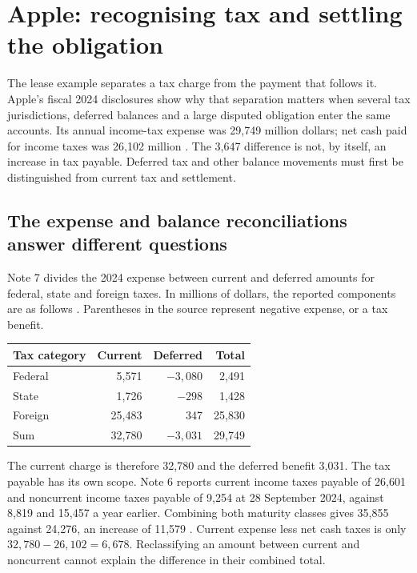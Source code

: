 \section{Apple: recognising tax and settling the obligation}
\label{sec:apple-tax-settlement}

The lease example separates a tax charge from the payment that follows it.
Apple's fiscal 2024 disclosures show why that separation matters when several
tax jurisdictions, deferred balances and a large disputed obligation enter
the same accounts. Its annual income-tax expense was 29,749 million dollars;
net cash paid for income taxes was 26,102 million
\citep[printed pp.~29 and 33]{apple2024}. The 3,647 difference is not, by itself,
an increase in tax payable. Deferred tax and other balance movements must first
be distinguished from current tax and settlement.

\subsection{The expense and balance reconciliations answer different questions}

Note 7 divides the 2024 expense between current and deferred amounts for federal,
state and foreign taxes. In millions of dollars, the reported components are
as follows \citep[Note 7, printed p.~40]{apple2024}. Parentheses in the source
represent negative expense, or a tax benefit.

\begin{center}
\begin{tabularx}{\linewidth}{@{}Xrrr@{}}
\toprule
Tax category & Current & Deferred & Total\\\midrule
Federal & 5,571 & $-3{,}080$ & 2,491\\
State & 1,726 & $-298$ & 1,428\\
Foreign & 25,483 & 347 & 25,830\\
Sum & 32,780 & $-3{,}031$ & 29,749\\\bottomrule
\end{tabularx}
\end{center}

The current charge is therefore 32,780 and the deferred benefit 3,031.
The tax payable has its own scope. Note 6 reports current income taxes payable
of 26,601 and noncurrent income taxes payable of 9,254 at 28 September 2024,
against 8,819 and 15,457 a year earlier. Combining both maturity classes gives
35,855 against 24,276, an increase of 11,579
\citep[Note 6, printed p.~39]{apple2024}. Current expense less net cash taxes
is only $32{,}780-26{,}102=6{,}678$. Reclassifying an amount between current
and noncurrent cannot explain the difference in their combined total.


